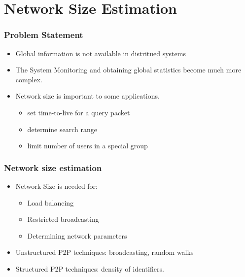 \documentclass[red]{beamer}
\begin{document}
\section{Network Size Estimation}

\begin{frame}
\frametitle{Problem Statement}
\begin{itemize}
\item Global information is not available in distritued systems
\item The System Monitoring and obtaining global statistics
become much more complex.
\item Network size is important to some applications.
\begin{itemize}
\item set time-to-live for a query packet
\item determine search range
\item limit number of users in a special group
\end{itemize}
\end{itemize}
\end{frame}

\begin{frame}
\frametitle{Network size estimation}
\begin{itemize}
\item Network Size is needed for:
\begin{itemize}
\item Load balancing
\item Restricted broadcasting 
\item Determining network parameters
\end{itemize}
\item Unstructured P2P techniques: broadcasting, random walks
\item Structured P2P techniques: density of identifiers.
\end{itemize}
\end{frame}

\end{document}
